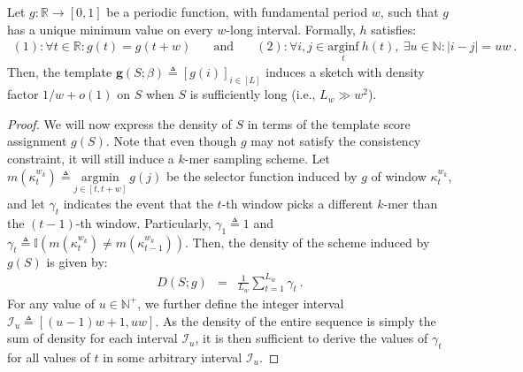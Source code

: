 \begin{proposition}
\label{c5-lem:periodic}
Let $g:\mathbb{R}\rightarrow[0,1]$ be a periodic function, with fundamental period $w$, such that $g$ has a unique minimum value on every $w$-long interval. Formally, $h$ satisfies:
\begin{eqnarray}
(1): \forall t \in \mathbb{R}: g(t) = g(t + w) \quad &\text{and}& \quad (2): \forall i, j \in \underset{t}{\mathrm{arginf}} \ h(t), \ \exists u \in \mathbb{N}: |i - j| = uw \nonumber \ .
\end{eqnarray}
Then, the template $\mathbf{g}(S; \beta) \triangleq [g(i)]_{i \in [L]}$ induces a sketch with density factor $1/w + o(1)$ on $S$ when $S$ is sufficiently long (i.e., $L_w \gg w^2$). 
\end{proposition} 
\begin{proof} 
We will now express the density of $S$ in terms of the template score assignment $g(S)$. Note that even though $g$ may not satisfy the consistency constraint, it will still induce a $k$-mer sampling scheme. Let $m(\kappa^{w_k}_t) \triangleq \underset{j\in[t, t+w]}{\mathrm{argmin}} \ g(j)$ be the selector function induced by $g$ of window $\kappa^{w_k}_t$, and let $\gamma_t$ indicates the event that the $t$-th window picks a different $k$-mer than the $(t-1)$-th window. Particularly, $\gamma_1 \triangleq 1$ and $\gamma_t \triangleq \mathbb{I}(m(\kappa^{w_k}_t) \neq m(\kappa^{w_k}_{t-1}))$. Then, the density of the scheme induced by $g(S)$ is given by:
\begin{eqnarray}
D(S; g)  &=& \frac{1}{L_w} \sum_{t=1}^{L_w}\gamma_t \ .
\end{eqnarray}
For any value of $u \in \mathbb{N}^{+}$, we further define the integer interval $\mathcal{I}_u \triangleq [(u-1)w + 1, uw]$. As the density of the entire sequence is simply the sum of density for each interval $\mathcal{I}_u$, it is then sufficient to derive the values of $\gamma_t$ for all values of $t$ in some arbitrary interval $\mathcal{I}_u$. 


\end{proof}
